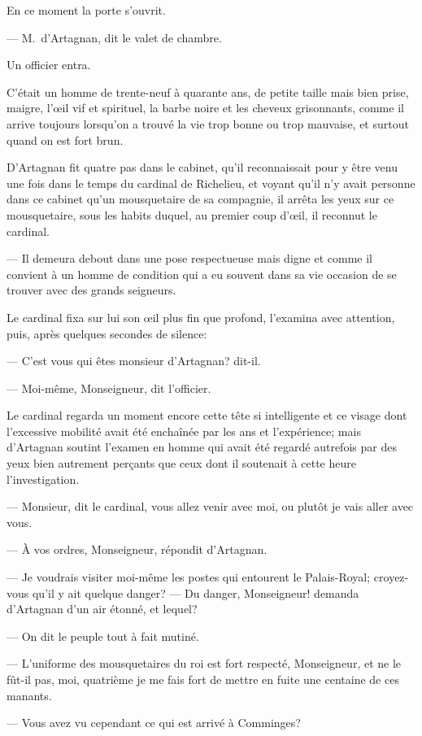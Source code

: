 En ce moment la porte s'ouvrit.

— M.~d'Artagnan, dit le valet de chambre.

Un officier entra.

C'était un homme de trente-neuf à quarante ans, de petite taille mais bien prise, maigre, l'œil vif et spirituel, la barbe noire et les cheveux grisonnants, comme il arrive toujours lorsqu'on a trouvé la vie trop bonne ou trop mauvaise, et surtout quand on est fort brun.

D'Artagnan fit quatre pas dans le cabinet, qu'il reconnaissait pour y être venu une fois dans le temps du cardinal de Richelieu, et voyant qu'il n'y avait personne dans ce cabinet qu'un mousquetaire de sa compagnie, il arrêta les yeux sur ce mousquetaire, sous les habits duquel, au premier coup d'œil, il reconnut le cardinal.

— Il demeura debout dans une pose respectueuse mais digne et comme il convient à un homme de condition qui a eu souvent dans sa vie occasion de se trouver avec des grands seigneurs.

Le cardinal fixa sur lui son œil plus fin que profond, l'examina avec attention, puis, après quelques secondes de silence:

— C'est vous qui êtes monsieur d'Artagnan? dit-il.

— Moi-même, Monseigneur, dit l'officier.

Le cardinal regarda un moment encore cette tête si intelligente et ce visage dont l'excessive mobilité avait été enchaînée par les ans et l'expérience; mais d'Artagnan soutint l'examen en homme qui avait été regardé autrefois par des yeux bien autrement perçants que ceux dont il soutenait à cette heure l'investigation.

— Monsieur, dit le cardinal, vous allez venir avec moi, ou plutôt je vais aller avec vous.

— À vos ordres, Monseigneur, répondit d'Artagnan.

— Je voudrais visiter moi-même les postes qui entourent le Palais-Royal; croyez-vous qu'il y ait quelque danger?
— Du danger, Monseigneur! demanda d'Artagnan d'un air étonné, et lequel?

— On dit le peuple tout à fait mutiné.

— L'uniforme des mousquetaires du roi est fort respecté, Monseigneur, et ne le fût-il pas, moi, quatrième je me fais fort de mettre en fuite une centaine de ces manants.

— Vous avez vu cependant ce qui est arrivé à Comminges?

